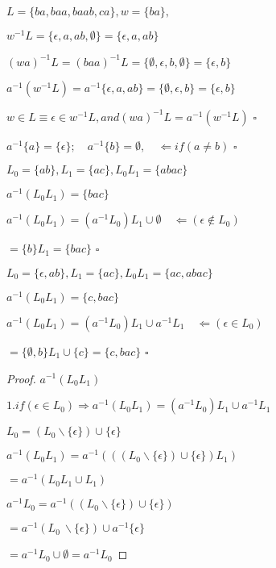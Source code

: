 \begin{example}
	$L = \{ba,baa,baab,ca\}, w = \{ba\},$
	
	$w^{-1}L =\{\epsilon,a,ab,\emptyset\} = \{\epsilon,a,ab\}$
	
	${(wa)}^{-1}L = {(baa)}^{-1}L = \{\emptyset,\epsilon,b,\emptyset\} = \{\epsilon,b\}$
	
	$a^{-1}(w^{-1}L) = a^{-1}\{\epsilon,a,ab\} = \{\emptyset,\epsilon,b\} = \{\epsilon,b\}$
	
	$w\in L \equiv \epsilon \in w^{-1}L,and {(wa)}^{-1}L = a^{-1}(w^{-1}L)$ \hfill$\square$
\end{example}

\begin{example}
	$a^{-1}\{a\} = \{\epsilon\}; \quad a^{-1}\{b\} = \emptyset,\quad\Leftarrow if (a\ne b)$ \hfill$\square$
\end{example}

\begin{example}
	$L_0 = \{ab\},L_1 = \{ac\}, L_0L_1 = \{abac\}$
	
	$a^{-1}(L_0L_1) = \{bac\}$
	
	$a^{-1}(L_0L_1) = (a^{-1}L_0)L_1 \cup \emptyset \quad \Leftarrow(\epsilon \notin L_0)$
	
	$= \{b\}L_1 = \{bac\}$ \hfill$\square$
\end{example}

\begin{example}
	$L_0 = \{\epsilon,ab\},L_1 = \{ac\}, L_0L_1 = \{ac,abac\}$
	
	$a^{-1}(L_0L_1) = \{c,bac\}$
	
	$a^{-1}(L_0L_1) = (a^{-1}L_0)L_1 \cup a^{-1}L_1 \quad\Leftarrow(\epsilon \in L_0)$
	
	$= \{\emptyset,b\}L_1 \cup \{c\} = \{c,bac\}$ \hfill$\square$
\end{example}

\begin{proof}
	$a^{-1}(L_0L_1)$
	
	$1. if(\epsilon \in L_0) \Rightarrow a^{-1}(L_0L_1) = (a^{-1}L_0)L_1 \cup a^{-1}L_1 $
	
	$L_0 = (L_0 \backslash \{\epsilon\}) \cup \{\epsilon\}$
	
	$a^{-1}(L_0L_1) = a^{-1}(((L_0 \backslash \{\epsilon\}) \cup \{\epsilon\})L_1)$
	
	$=a^{-1}(L_0L_1\cup L_1)$
	
	$a^{-1}L_0 = a^{-1}((L_0 \backslash \{\epsilon\}) \cup \{\epsilon\})$
	
	$=a^{-1}(L_0\ \backslash \{\epsilon \}) \cup a^{-1}\{\epsilon \}$
	
	$=a^{-1}L_0 \cup \emptyset = a^{-1}L_0$
\end{proof}
	

